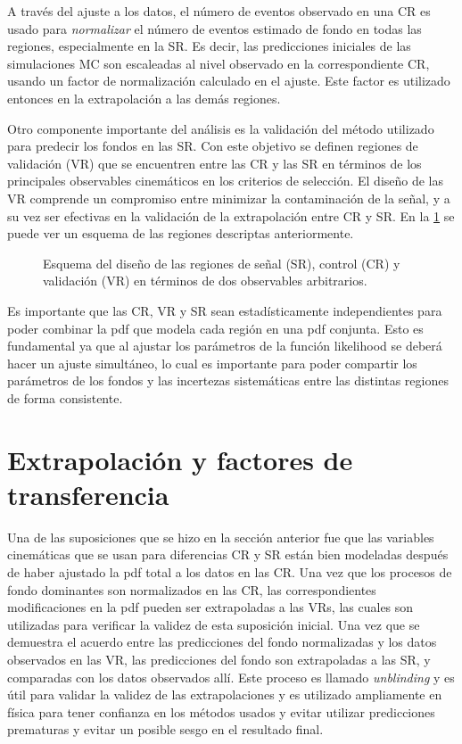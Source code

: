 A través del ajuste a los datos, el número de eventos observado en una CR es
usado para \emph{normalizar} el número de eventos estimado de fondo en todas las
regiones, especialmente en la SR. Es decir, las predicciones iniciales de las
simulaciones MC son escaleadas al nivel observado en la correspondiente CR,
usando un factor de normalización calculado en el ajuste. Este factor es
utilizado entonces en la extrapolación a las demás regiones.

Otro componente importante del análisis es la validación del método utilizado
para predecir los fondos en las SR. Con este objetivo se definen regiones de
validación (VR) que se encuentren entre las CR y las SR en términos de los
principales observables cinemáticos en los criterios de selección. El diseño de
las VR comprende un compromiso entre minimizar la contaminación de la señal, y a su
vez ser efectivas en la validación de la extrapolación entre CR y SR. En la
\cref{fig:regions_sketch} se puede ver un esquema de las regiones descriptas
anteriormente.

\begin{figure}[h]
  \centering 
  \caption{Esquema del diseño de las regiones de señal (SR), control (CR) y
    validación (VR) en términos de dos observables arbitrarios.}
  \label{fig:regions_sketch}
\end{figure}

Es importante que las CR, VR y SR sean estadísticamente independientes para
poder combinar la pdf que modela cada región en una pdf conjunta. Esto es
fundamental ya que al ajustar los parámetros de la función likelihood se deberá
hacer un ajuste simultáneo, lo cual es importante para poder compartir los
parámetros de los fondos y las incertezas sistemáticas entre las distintas
regiones de forma consistente.

\section{Extrapolación y factores de transferencia}

Una de las suposiciones que se hizo en la sección anterior fue que las variables
cinemáticas que se usan para diferencias CR y SR están bien modeladas
después de haber ajustado la pdf total a los datos en las CR. Una vez que los
procesos de fondo dominantes son normalizados en las CR, las correspondientes
modificaciones en la pdf pueden ser extrapoladas a las VRs, las cuales son
utilizadas para verificar la validez de esta suposición inicial. Una vez que se
demuestra el acuerdo entre las predicciones del fondo normalizadas y los datos
observados en las VR, las predicciones del fondo son extrapoladas a las SR,
y comparadas con los datos observados allí. Este proceso es llamado
\emph{unblinding} y es útil para validar la validez de las extrapolaciones y es
utilizado ampliamente en física para tener confianza en los métodos usados y
evitar utilizar predicciones prematuras y evitar un posible sesgo en el
resultado final.

